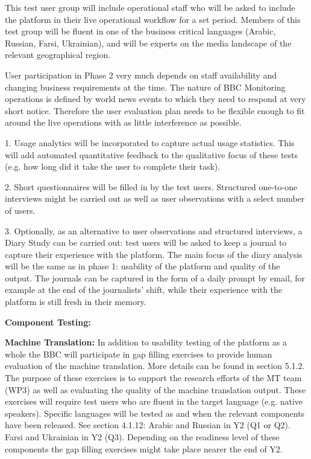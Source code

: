 This test user group will include operational staff who will be asked to include the \SUMMA platform in their live operational workflow for a set period. Members of this test group will be fluent in one of the business critical languages (Arabic, Russian, Farsi, Ukrainian), and will be experts on the  media landscape of the relevant geographical region.

User participation in Phase 2 very much depends on staff availability and changing business requirements at the time. The nature of BBC Monitoring operations is defined by world news events to which they need to respond at very short notice. Therefore the user evaluation plan needs to be flexible enough to fit around the live operations with as little interference as possible.
\smallskip

1. Usage analytics will be incorporated to capture actual usage statistics. This will add automated quantitative feedback to the qualitative focus of these tests (e.g. how long did it take the user to complete their task).

2. Short questionnaires will be filled in by the test users. Structured one-to-one interviews might be carried out as well as user observations with a select number of users. 

3. Optionally, as an alternative to user observations and structured interviews, a Diary Study can be carried out: test users will be asked to keep a journal to capture their experience with the platform. The main focus of the diary analysis will be the same as in phase 1: usability of the platform and quality of the output. The journals can be captured in the form of a daily prompt by email, for example at the end of the journalists' shift, while their experience with the platform is still fresh in their memory.
		
\medskip

\textbf{Component Testing:}

\textbf{Machine Translation:}
In addition to usability testing of the platform as a whole the BBC will participate in gap filling exercises to provide human evaluation of the machine translation. More details can be found in section 5.1.2. The purpose of these exercises is to support the research efforts of the MT team (WP3) as well as evaluating the quality of the machine translation output. These exercises will require test users who are fluent in the target language (e.g. native speakers).
Specific languages will be tested as and when the relevant components have been released. See section 4.1.12: Arabic and Russian in Y2 (Q1 or Q2). Farsi and Ukrainian in Y2 (Q3). Depending on the readiness level of these components the gap filling exercises might take place nearer the end of Y2.

